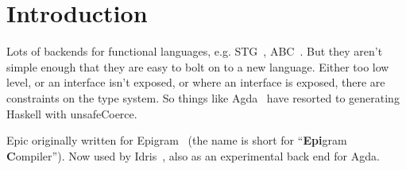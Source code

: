 \section{Introduction}

Lots of backends for functional languages,
e.g. STG~\cite{evalpush,stg,llvm-haskell}, ABC~\cite{abc-machine}.
But they aren't simple enough that they are easy to bolt on to a new
language. Either too low level, or an interface isn't exposed, or
where an interface is exposed, there are constraints on the type
system. So things like Agda~\cite{norell-thesis} have resorted to
generating Haskell with unsafeCoerce.

Epic originally written for Epigram~\cite{levitation} (the name is
short for ``\textbf{Epi}gram \textbf{C}ompiler''). Now used by
Idris~\cite{idris-plpv}, also as an experimental back end for Agda.
